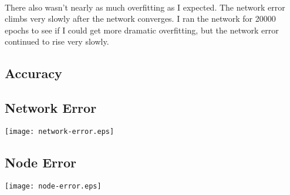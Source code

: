 \documentclass{article}
\begin{document}
\paragraph{}
There also wasn't nearly as much overfitting as I expected.  The network
error climbs very slowly after the network converges.  I ran the network
for 20000 epochs to see if I could get more dramatic overfitting, but
the network error continued to rise very slowly.

\subsection{Accuracy}


\subsection{Network Error}
\texttt{[image: network-error.eps]}

\subsection{Node Error}
\texttt{[image: node-error.eps]}
\end{document}

